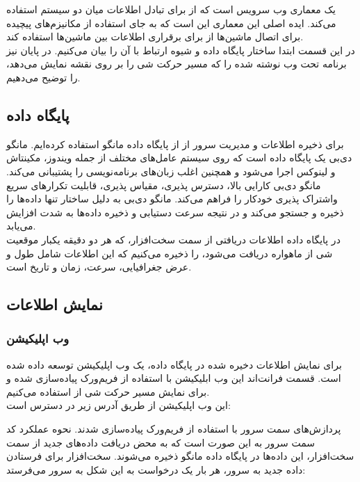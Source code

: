 یک معماری وب سرویس است که از  برای تبادل اطلاعات میان دو سیستم استفاده می‌کند. ایده اصلی این معماری این است که به جای استفاده از مکانیزم‌های پیچیده برای اتصال ماشین‌ها از  برای برقراری اطلاعات بین ماشین‌ها استفاده کند.\\
در این قسمت ابتدا ساختار پایگاه داده و شیوه ارتباط با آن را بیان می‌کنیم. در پایان نیز برنامه تحت وب نوشته شده را که مسیر حرکت شی را بر روی نقشه نمایش می‌دهد، را توضیح می‌دهیم.
\subsection{پایگاه داده}
برای ذخیره اطلاعات و مدیریت سرور از از پایگاه داده مانگو استفاده کرده‌ایم. مانگو دی‌بی یک پایگاه داده  است که روی سیستم عامل‌های مختلف از جمله ویندوز، مکینتاش و لینوکس اجرا می‌شود و همچنین اغلب زبان‌های برنامه‌نویسی را پشتیبانی می‌کند. مانگو دی‌بی کارایی بالا، دسترس پذیری، مقیاس پذیری، قابلیت تکرارهای سریع واشتراک پذیری خودکار را فراهم می‌کند. مانگو دی‌بی به دلیل ساختار  تنها داده‌ها را ذخیره و جستجو می‌کند و در نتیجه سرعت دستیابی و ذخیره داده‌ها به شدت افزایش می‌یابد.
\\
در پایگاه داده اطلاعات دریافتی از سمت سخت‌افزار، که هر دو دقیقه یکبار موقعیت شی از ماهواره دریافت می‌شود، را ذخیره می‌کنیم که این اطلاعات شامل طول و عرض جغرافیایی، سرعت، زمان و تاریخ است.
\subsection{نمایش اطلاعات}
\subsubsection{وب اپلیکیشن}
برای نمایش اطلاعات دخیره شده در پایگاه داده، یک وب اپلیکیشن توسعه داده شده است. قسمت فرانت‌اند این وب ابلیکیشن با استفاده از فریم‌ورک  پیاده‌سازی شده و برای نمایش مسیر حرکت شی از  استفاده می‌کنیم. \\این وب اپلیکیشن از طریق آدرس زیر در دسترس است: \href{http://103.216.62.79}{}


پردازش‌های سمت سرور با استفاده از فریم‌ورک  پیاده‌سازی شدند. نحوه عملکرد کد سمت سرور به این صورت است که به محض دریافت داده‌های جدید از سمت سخت‌افزار، این داده‌ها در پایگاه داده مانگو ذخیره می‌شوند. سخت‌افزار برای فرستادن داده جدید به سرور، هر بار یک درخواست  به این شکل به سرور می‌فرستد: 


